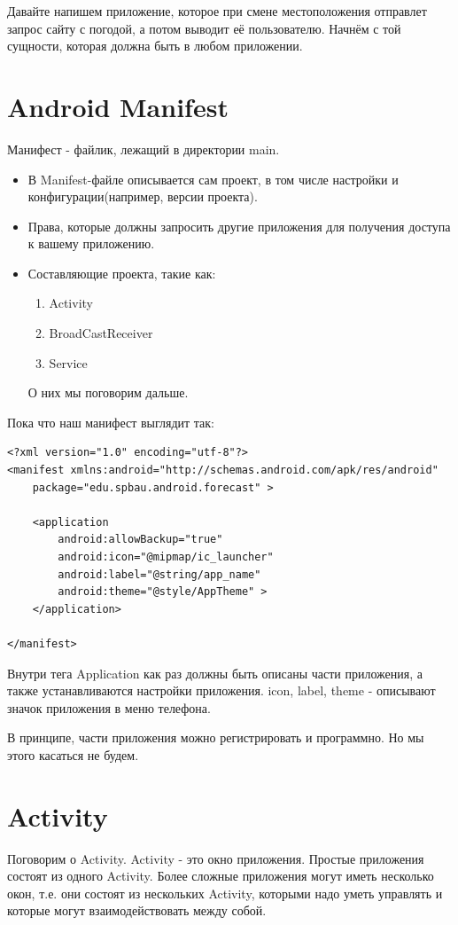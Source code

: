\documentclass[12 pt]{article}
\begin{document}
	Давайте напишем приложение, которое при смене местоположения отправлет запрос сайту с погодой, а потом выводит её пользователю. Начнём с той сущности, которая должна быть в любом приложении.
\section{Android Manifest}
    Манифест - файлик, лежащий в директории main.
    \begin{itemize}
    	\item В Manifest-файле описывается сам проект, в том числе настройки и конфигурации(например, версии проекта).
    	\item Права, которые должны запросить другие приложения для получения доступа к вашему приложению. 
    	\item Составляющие проекта, такие как:
		\begin{enumerate}
        	\item Activity 
        	\item BroadCastReceiver 
        	\item Service
        \end{enumerate}
        О них мы поговорим дальше.
    \end{itemize}
    
    Пока что наш манифест выглядит так:
    \begin{lstlisting}
<?xml version="1.0" encoding="utf-8"?>
<manifest xmlns:android="http://schemas.android.com/apk/res/android"
    package="edu.spbau.android.forecast" >

    <application
        android:allowBackup="true"
        android:icon="@mipmap/ic_launcher"
        android:label="@string/app_name"
        android:theme="@style/AppTheme" >
    </application>

</manifest>    
    \end{lstlisting}
    Внутри тега Application как раз должны быть описаны части приложения, а также устанавливаются настройки приложения. icon, label, theme - описывают значок приложения в меню телефона.
    
    В принципе, части приложения можно регистрировать и программно. Но мы этого касаться не будем.
\section{Activity}
    Поговорим о Activity. Activity - это окно приложения. Простые приложения состоят из одного Activity. Более сложные приложения могут иметь несколько окон, т.е. они состоят из нескольких Activity, которыми надо уметь управлять и которые могут взаимодействовать между собой.
\end{document}
